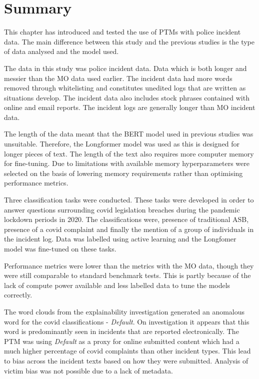 \section{Summary} This chapter has introduced and tested the use of PTMs with police incident data. The main difference between this study and the previous studies is the type of data analysed and the model used. 

The data in this study was police incident data. Data which is both longer and messier than the MO data used earlier. The incident data had more words removed through whitelisting and constitutes unedited logs that are written as situations develop. The incident data also includes stock phrases contained with online and email reports. The incident logs are generally longer than MO incident data.

The length of the data meant that the BERT model used in previous studies was unsuitable. Therefore, the Longformer model was used as this is designed for longer pieces of text. The length of the text also requires more computer memory for fine-tuning. Due to limitations with  available memory hyperparameters were selected on the basis of lowering memory requirements rather than optimising performance metrics.

Three classification tasks were conducted. These tasks were developed in order to answer questions surrounding covid legislation breaches during the pandemic lockdown periods in 2020. The classifications were, presence of traditional ASB, presence of a covid complaint and finally the mention of a group of individuals in the incident log. Data was labelled using active learning and the Longfomer model was fine-tuned on these tasks.

Performance metrics were lower than the metrics with the MO data, though they were still comparable to standard benchmark tests. This is partly because of the lack of compute power available  and less labelled data to tune the models correctly.

The word clouds from the explainability investigation generated an anomalous word for the covid classifications - \emph{Default}. On investigation it appears that this word is predominantly seen in incidents that are reported electronically. The PTM was using \emph{Default} as a proxy for online submitted content which had a much higher percentage of covid complaints than other incident types. This lead to bias across the incident texts based on how they were submitted. Analysis of victim bias was not possible due to a lack of metadata. 


